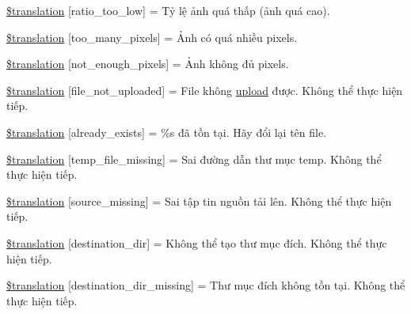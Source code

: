 \begin{DoxyCompactItemize}
\item 
\hyperlink{class_8upload_8vn___v_n_8php_ac533b9a479f056b0b8623e4268f068c2}{\$translation} \mbox{[}\textquotesingle{}ratio\+\_\+too\+\_\+low\textquotesingle{}\mbox{]} = \textquotesingle{}Tỷ lệ ảnh quá thấp (ảnh quá cao).\textquotesingle{}
\item 
\hyperlink{class_8upload_8vn___v_n_8php_aa4051ef64e94a3f8295c63cf85544016}{\$translation} \mbox{[}\textquotesingle{}too\+\_\+many\+\_\+pixels\textquotesingle{}\mbox{]} = \textquotesingle{}Ảnh có quá nhiều pixels.\textquotesingle{}
\item 
\hyperlink{class_8upload_8vn___v_n_8php_a1fe342c27ce61f4ff4e0120ba647033e}{\$translation} \mbox{[}\textquotesingle{}not\+\_\+enough\+\_\+pixels\textquotesingle{}\mbox{]} = \textquotesingle{}Ảnh không đủ pixels.\textquotesingle{}
\item 
\hyperlink{class_8upload_8vn___v_n_8php_a4ce76e7be0b3a03c2b47f6d70c21832e}{\$translation} \mbox{[}\textquotesingle{}file\+\_\+not\+\_\+uploaded\textquotesingle{}\mbox{]} = \textquotesingle{}File không \hyperlink{classupload}{upload} được. Không thể thực hiện tiếp.\textquotesingle{}
\item 
\hyperlink{class_8upload_8vn___v_n_8php_afd84e910217f04139f567c41e292afa5}{\$translation} \mbox{[}\textquotesingle{}already\+\_\+exists\textquotesingle{}\mbox{]} = \textquotesingle{}\%s đã tồn tại. Hãy đổi lại tên file.\textquotesingle{}
\item 
\hyperlink{class_8upload_8vn___v_n_8php_ab0fa87a88aba2624004581eed0633325}{\$translation} \mbox{[}\textquotesingle{}temp\+\_\+file\+\_\+missing\textquotesingle{}\mbox{]} = \textquotesingle{}Sai đường dẫn thư mục temp. Không thể thực hiện tiếp.\textquotesingle{}
\item 
\hyperlink{class_8upload_8vn___v_n_8php_aceaaf7355acaaf10f0ae60378d03c468}{\$translation} \mbox{[}\textquotesingle{}source\+\_\+missing\textquotesingle{}\mbox{]} = \textquotesingle{}Sai tập tin nguồn tải lên. Không thể thực hiện tiếp.\textquotesingle{}
\item 
\hyperlink{class_8upload_8vn___v_n_8php_aff2427c72a2598aefa6d58df1dd18b08}{\$translation} \mbox{[}\textquotesingle{}destination\+\_\+dir\textquotesingle{}\mbox{]} = \textquotesingle{}Không thể tạo thư mục đích. Không thể thực hiện tiếp.\textquotesingle{}
\item 
\hyperlink{class_8upload_8vn___v_n_8php_a9ef28d3cf09942c6c0a1e77fa09185e8}{\$translation} \mbox{[}\textquotesingle{}destination\+\_\+dir\+\_\+missing\textquotesingle{}\mbox{]} = \textquotesingle{}Thư mục đích không tồn tại. Không thể thực hiện tiếp.\textquotesingle{}

\end{DoxyCompactItemize}
